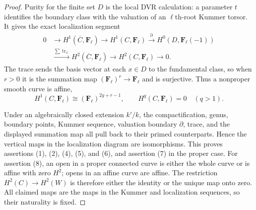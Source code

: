 \begin{proof}
Purity for the finite set $D$ is the local DVR calculation: a parameter
$t$ identifies the boundary class with the valuation of an
$\ell$th-root Kummer torsor.  It gives the exact localization segment
\[
\begin{aligned}
0&\longrightarrow H^1(\overline C,\mathbf F_\ell)
 \longrightarrow H^1(C,\mathbf F_\ell)
 \xrightarrow{\partial}H^0(D,\mathbf F_\ell(-1))\\
 &\xrightarrow{\sum\operatorname{tr}_x}
 H^2(\overline C,\mathbf F_\ell)
 \longrightarrow H^2(C,\mathbf F_\ell)\longrightarrow0 .
\end{aligned}
\]
The trace sends the basis vector at each $x\in D$ to the fundamental class,
so when $r>0$ it is the summation map
$(\mathbf F_\ell)^r\to\mathbf F_\ell$ and is surjective.  Thus a nonproper
smooth curve is affine,
\[
 H^1(C,\mathbf F_\ell)\cong(\mathbf F_\ell)^{2g+r-1},
 \qquad H^q(C,\mathbf F_\ell)=0\quad(q>1).
\]

Under an algebraically closed extension $k'/k$, the compactification, genus,
boundary points, Kummer sequence, valuation boundary $\partial$, trace, and
the displayed summation map all pull back to their primed counterparts.
Hence the vertical maps in the localization diagram are isomorphisms.
This proves assertions (1), (2), (4), (5), and (6), and assertion (7) in the
proper case.  For assertion (8), an open in a proper connected curve is
either the whole curve or is affine with zero $H^2$; opens in an affine
curve are affine.  The restriction $H^2(C)\to H^2(W)$ is therefore either
the identity or the unique map onto zero.  All claimed maps are the maps in
the Kummer and localization sequences, so their naturality is fixed.
\end{proof}

